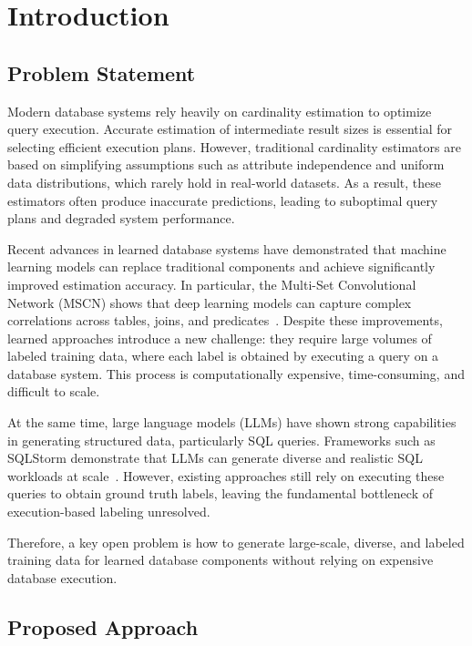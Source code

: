 
\chapter{Introduction}
\label{chap:introduction}
\pagestyle{plain}
\setcounter{page}{1}

\section{Problem Statement}

Modern database systems rely heavily on cardinality estimation to optimize query execution. Accurate estimation of intermediate result sizes is essential for selecting efficient execution plans. However, traditional cardinality estimators are based on simplifying assumptions such as attribute independence and uniform data distributions, which rarely hold in real-world datasets. As a result, these estimators often produce inaccurate predictions, leading to suboptimal query plans and degraded system performance.

Recent advances in learned database systems have demonstrated that machine learning models can replace traditional components and achieve significantly improved estimation accuracy. In particular, the Multi-Set Convolutional Network (MSCN) shows that deep learning models can capture complex correlations across tables, joins, and predicates~\cite{DBLP:conf/cidr/KipfKRLBK19}. Despite these improvements, learned approaches introduce a new challenge: they require large volumes of labeled training data, where each label is obtained by executing a query on a database system. This process is computationally expensive, time-consuming, and difficult to scale.

At the same time, large language models (LLMs) have shown strong capabilities in generating structured data, particularly SQL queries. Frameworks such as SQLStorm demonstrate that LLMs can generate diverse and realistic SQL workloads at scale~\cite{DBLP:journals/pvldb/SchmidtLBN25}. However, existing approaches still rely on executing these queries to obtain ground truth labels, leaving the fundamental bottleneck of execution-based labeling unresolved.

Therefore, a key open problem is how to generate large-scale, diverse, and labeled training data for learned database components without relying on expensive database execution.

\section{Proposed Approach}

